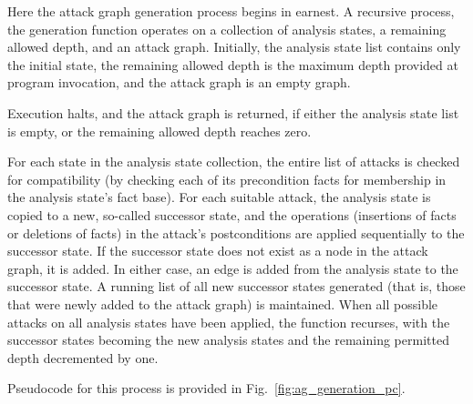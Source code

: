 Here the attack graph generation process begins in earnest. A recursive process,
the generation function operates on a collection of analysis states, a remaining
allowed depth, and an attack graph. Initially, the analysis state
list contains only the initial state, the remaining allowed depth is the maximum
depth provided at program invocation, and the attack graph is an empty graph.

Execution halts, and the attack graph is returned, if either the analysis
state list is empty, or the remaining allowed depth reaches zero.

For each state in the analysis state collection, the entire list of attacks
is checked for compatibility (by checking each of its precondition
facts for membership in the analysis state's fact base). For each suitable
attack, the analysis state is copied to a new, so-called successor state, and
the operations (insertions of facts or deletions of facts) in the attack's
postconditions are applied sequentially to the successor state. If the
successor state does not exist as a node in the attack graph, it is added. In
either case, an edge is added from the analysis state to the successor state.
A running list of all new successor states generated (that is, those that were
newly added to the attack graph) is maintained. When all possible attacks on
all analysis states have been applied, the function recurses, with the
successor states becoming the new analysis states and the remaining permitted
depth decremented by one.

Pseudocode for this process is provided in Fig.~\ref{fig:ag_generation_pc}.

